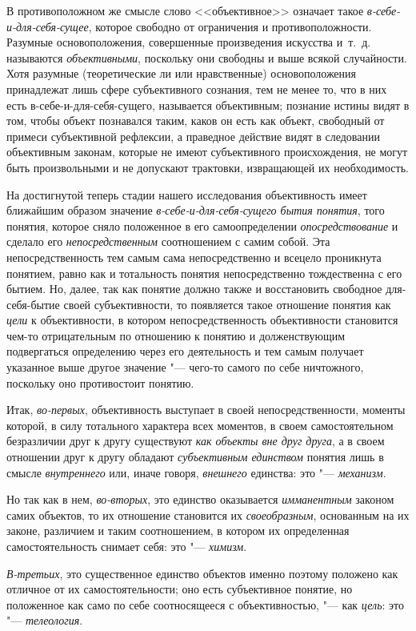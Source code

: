 {{В противоположном же смысле слово <<объективное>> означает такое
{\em в-себе-и-для-себя-сущее},
которое свободно от ограничения и противоположности. Разумные
основоположения, совершенные произведения искусства и~т.~д. называются
{\em объективными},
поскольку они свободны и выше всякой случайности. Хотя
разумные (теоретические ли или нравственные) основоположения принадлежат
лишь сфере субъективного сознания, тем не менее то, что в них есть
в-себе-и-для-себя-сущего, называется объективным; познание истины видят в
том, чтобы объект познавался таким, каков он есть как объект, свободный от
примеси субъективной рефлексии, а праведное действие видят в следовании
объективным законам, которые не имеют субъективного происхождения, не могут
быть произвольными и не допускают трактовки, извращающей их необходимость.

На достигнутой теперь стадии нашего исследования объективность
имеет ближайшим образом значение {\em в-себе-и-для-себя-сущего бытия
понятия}, того понятия, которое сняло положенное в его
самоопределении {\em опосредствование} и сделало его {\em непосредственным}
соотношением с самим собой. Эта непосредственность тем самым
сама непосредственно и всецело проникнута понятием, равно как и тотальность
понятия непосредственно тождественна с его бытием. Но, далее, так как
понятие должно также и восстановить свободное для-себя-бытие своей
субъективности, то появляется такое отношение понятия как {\em цели} к
объективности, в котором непосредственность объективности становится чем-то
отрицательным по отношению к понятию и долженствующим подвергаться
определению через его деятельность и тем самым получает указанное выше
другое значение "--- чего-то самого по себе ничтожного,
поскольку оно противостоит понятию.

Итак, {\em во-первых}, объективность выступает в своей непосредственности,
моменты которой, в силу тотального характера всех моментов, в своем
самостоятельном безразличии друг к другу существуют {\em как объекты вне друг
друга}, а в своем отношении друг к другу обладают {\em субъективным единством}
понятия лишь в смысле {\em внутреннего} или, иначе говоря, {\em внешнего}
единства: это "--- {\em механизм}.

Но так как в нем, {\em во-вторых}, это единство оказывается {\em имманентным}
законом самих объектов, то их отношение становится их {\em своеобразным},
основанным на их законе, различием и таким соотношением, в
котором их определенная самостоятельность снимает себя: это "--- {\em химизм}.

{\em В-третьих}, это
существенное единство объектов именно поэтому положено как отличное от их
самостоятельности; оно есть субъективное понятие, но положенное как само по
себе соотносящееся с объективностью, "--- как
{\em цель}: это "--- {\em телеология}.

}}
